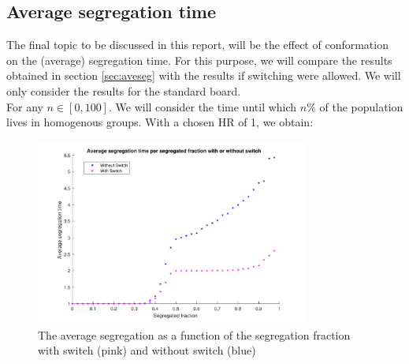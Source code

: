 \subsection{Average segregation time}
The final topic to be discussed in this report, will be the effect of conformation on the (average) segregation time. 
For this purpose, we will compare the results obtained in section \ref{sec:aveseg} with the results if switching were allowed. 
We will only consider the results for the standard board.\\
For any \(n\in [0,100]\). We will consider the time until which \(n\%\) of the population lives in homogenous groups. With a chosen HR of 1, we obtain:

\begin{figure}[H]
    \centering
    \includegraphics[width=0.8\textwidth]{Avesegsw2}
    \caption{The average segregation as a function of the segregation fraction with switch (pink) and without switch (blue)}
    \label{fig:avesegsw}
\end{figure}

